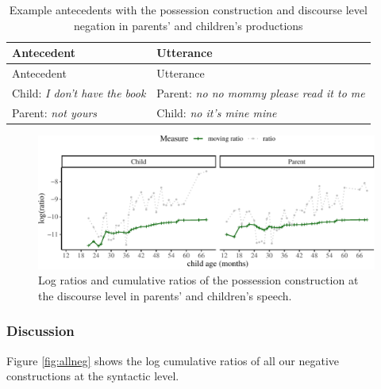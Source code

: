 \documentclass[
  english,
  man,floatsintext]{apa6}
\begin{document}
\begin{longtable}[]{@{}ll@{}}
\caption{\label{tab:dispossess} Example antecedents with the possession construction and discourse level negation in parents' and children's productions}\tabularnewline
\toprule
Antecedent & Utterance \\
\midrule
\endfirsthead
\toprule
Antecedent & Utterance \\
\midrule
\endhead
Child: \emph{I don't have the book} & Parent: \emph{no no mommy please read it to me} \\
Parent: \emph{not yours} & Child: \emph{no it's mine mine} \\
\bottomrule
\end{longtable}

\begin{figure}[H]

{\centering \includegraphics{neg_construction_article_files/figure-latex/possessiondiscourse-1} 

}

\caption{Log ratios and cumulative ratios of the possession construction at the discourse level in parents' and children's speech.}\label{fig:possessiondiscourse}
\end{figure}

\hypertarget{discussion}{%
\subsubsection{Discussion}\label{discussion}}

Figure \ref{fig:allneg} shows the log cumulative ratios of all our negative constructions at the syntactic level.
\end{document}
